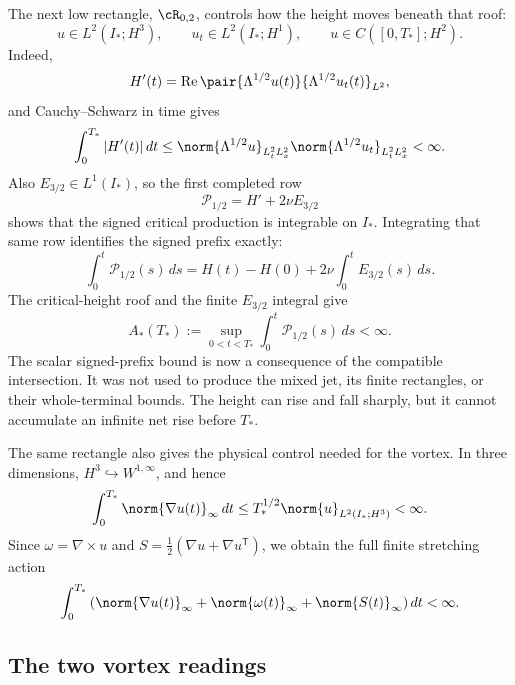 The next low rectangle, \(\cR_{0,2}\), controls how the height moves beneath that
roof:
\begin{equation}\label{eq:LowRectangleZeroTwo}
  u\in L^2(I_*;H^3),
  \qquad
  u_t\in L^2(I_*;H^1),
  \qquad
  u\in C([0,T_*];H^2).
\end{equation}
Indeed,
\[
  H'(t)
  =\operatorname{Re}
  \pair{\Lambda^{1/2}u(t)}{\Lambda^{1/2}u_t(t)}_{L^2},
\]
and Cauchy--Schwarz in time gives
\begin{equation}\label{eq:CriticalHeightTotalVariationBound}
  \int_0^{T_*}|H'(t)|\,dt
  \leq
  \norm{\Lambda^{1/2}u}_{L^2_tL^2_x}
  \norm{\Lambda^{1/2}u_t}_{L^2_tL^2_x}
  <\infty.
\end{equation}
Also \(E_{3/2}\in L^1(I_*)\), so the first completed row
\[
  \mathcal P_{1/2}=H'+2\nu E_{3/2}
\]
shows that the signed critical production is integrable on \(I_*\).
Integrating that same row identifies the signed prefix exactly:
\begin{equation}\label{eq:BodySignedCriticalPrefix}
  \int_0^t\mathcal P_{1/2}(s)\,ds
  =H(t)-H(0)+2\nu\int_0^tE_{3/2}(s)\,ds.
\end{equation}
The critical-height roof and the finite \(E_{3/2}\) integral give
\begin{equation}\label{eq:BodySignedCriticalPrefixBound}
  A_*(T_*)
  :=\sup_{0<t<T_*}\int_0^t\mathcal P_{1/2}(s)\,ds
  <\infty.
\end{equation}
The scalar signed-prefix bound is now a consequence of the compatible intersection.
It was not used to produce the mixed jet, its finite rectangles, or their whole-terminal bounds.
The height can rise and fall sharply, but it cannot accumulate an infinite net rise before \(T_*\).

The same rectangle also gives the physical control needed for the vortex.  In three dimensions,
\(H^3\hookrightarrow W^{1,\infty}\), and hence
\[
  \int_0^{T_*}\norm{\nabla u(t)}_\infty\,dt
  \leq
  T_*^{1/2}\norm{u}_{L^2(I_*;H^3)}<\infty.
\]
Since \(\omega=\nabla\times u\) and \(S=\tfrac12(\nabla u+\nabla u^{\mathsf T})\),
we obtain the full finite stretching action
\begin{equation}\label{eq:FiniteLipschitzVorticityStrainAction}
  \int_0^{T_*}
  \left(
    \norm{\nabla u(t)}_\infty
    +\norm{\omega(t)}_\infty
    +\norm{S(t)}_\infty
  \right)dt
  <\infty.
\end{equation}

\subsection{The two vortex readings}\label{sub:ClosingCriticalHeightZenoAndTheVortex}

